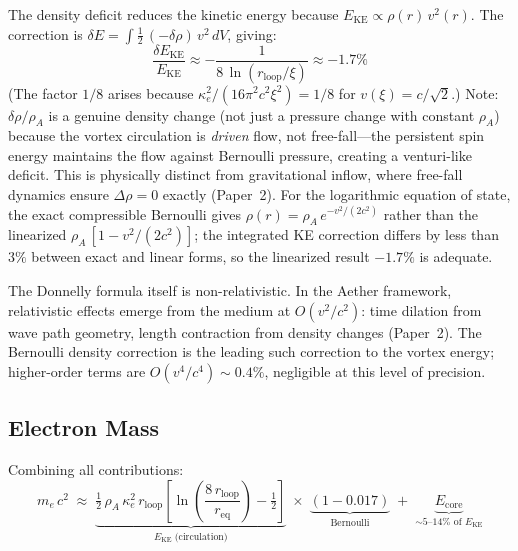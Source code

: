 \documentclass[12pt,letterpaper]{article}
\newcommand{\rhoa}{\rho_{\!A}}
\newcommand{\rloop}{r_{\mathrm{loop}}}
\begin{document}
The density deficit reduces the kinetic energy because
$E_{\mathrm{KE}} \propto \rho(r)\,v^2(r)$.  The correction is
$\delta E = \int\!\tfrac{1}{2}\,(-\delta\rho)\,v^2\,dV$, giving:
%
\begin{equation}
  \frac{\delta E_{\mathrm{KE}}}{E_{\mathrm{KE}}} \approx
  -\frac{1}{8\,\ln(\rloop/\xi)}
  \approx -1.7\%
  \label{eq:ke-correction}
\end{equation}
%
(The factor $1/8$ arises because $\kappa_e^2/(16\pi^2 c^2 \xi^2) = 1/8$
for $v(\xi) = c/\sqrt{2}$.)  Note: $\delta\rho/\rhoa$ is a genuine density
change (not just a pressure change with constant $\rhoa$) because the vortex
circulation is \emph{driven} flow, not free-fall---the persistent spin energy
maintains the flow against Bernoulli pressure, creating a venturi-like deficit.
This is physically distinct from gravitational inflow, where free-fall dynamics
ensure $\Delta\rho = 0$ exactly (Paper~2).  For the logarithmic equation of
state, the exact compressible Bernoulli gives $\rho(r) = \rhoa\,e^{-v^2/(2c^2)}$
rather than the linearized $\rhoa\,[1 - v^2/(2c^2)]$; the integrated KE
correction differs by less than $3\%$ between exact and linear forms, so the
linearized result $-1.7\%$ is adequate.

The Donnelly formula itself is non-relativistic.  In the Aether framework,
relativistic effects emerge from the medium at $O(v^2/c^2)$: time dilation
from wave path geometry, length contraction from density changes (Paper~2).
The Bernoulli density correction is the leading such correction to the vortex
energy; higher-order terms are $O(v^4/c^4) \sim 0.4\%$, negligible at this
level of precision.

\subsection{Electron Mass}

Combining all contributions:
%
\begin{equation}
  \boxed{m_e\,c^2 \;\approx\;
  \underbrace{\tfrac{1}{2}\,\rhoa\,\kappa_e^2\,\rloop
  \left[\ln\!\left(\frac{8\,\rloop}{r_{\mathrm{eq}}}\right)
  - \tfrac{1}{2}\right]}_{\displaystyle E_{\mathrm{KE}}\;\text{(circulation)}}
  \;\times\;\underbrace{(1 - 0.017)}_{\text{Bernoulli}}
  \;+\; \underbrace{E_{\mathrm{core}}}_{\displaystyle\sim\!5\text{--}14\%\text{ of }E_{\mathrm{KE}}}}
  \label{eq:me-total}
\end{equation}
\end{document}
